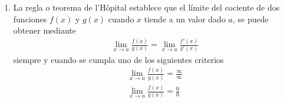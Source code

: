 \documentclass{article}
\begin{document}
\begin{enumerate}
\item La regla o teorema de l'H\^opital establece que el límite del cociente de
dos funciones $f(x)$ y $g(x)$ cuando $x$ tiende a un valor dado $a$, se puede 
obtener mediante 
\begin{align*}
\lim_{x \rightarrow a} \frac{f(x)}{g(x)}= 
\lim_{x \rightarrow a}\frac{f'(x)}{g'(x)}     
\end{align*} 
siempre y cuando se cumpla uno de los siguientes criterios
\begin{align*}
\lim_{x \rightarrow a} \frac{f(x)}{g(x)}= \frac{\infty}{\infty} \\
\lim_{x \rightarrow a} \frac{f(x)}{g(x)}= \frac{0}{0}
\end{align*} 

\end{enumerate}
\end{document}

